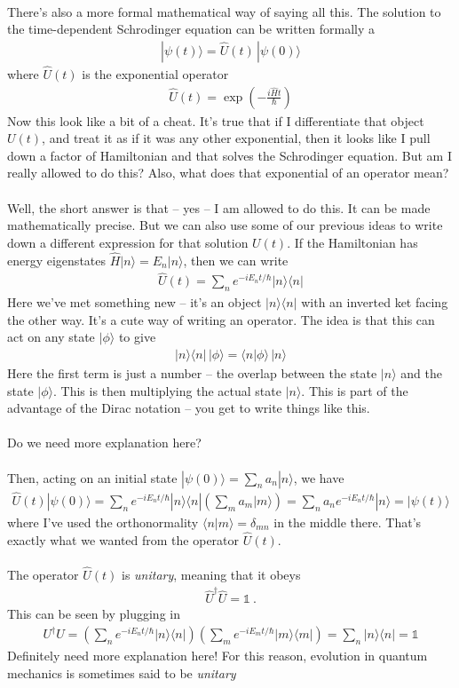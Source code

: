 \documentclass[12pt]{article}
\def\be{\begin{eqnarray}}
\def\ee{\end{eqnarray}}
\newcommand{\nn}{\nonumber}
\newcommand\para{\paragraph{}}
\newcommand{\ket}[1]{|#1\rangle}
\newcommand{\bra}[1]{\langle#1|}
\newcommand{\co}{\color{olive}}
\newcommand{\cblue}{\color{blue}}
\begin{document}
{\para
There's also a more formal mathematical way of saying all this. 
{\co The solution to the time-dependent Schrodinger equation can be written formally a 
%
\be \ket{\psi(t)} = \hat{U}(t)\, \ket{\psi(0)}\nn\ee
%
where $\hat{U}(t)$ is the exponential operator
%
\be \hat{U}(t) = \exp\left(-\frac{i\hat{H}t}{\hbar}
\right)\nn\ee
%
} Now this look like a bit of a cheat. It's true that if I differentiate that object $U(t)$, and treat it as if it was any other exponential, then it looks like I pull down a factor of Hamiltonian and that solves the Schrodinger equation. But am I really allowed to do this? Also, what does that exponential of an operator mean? 

\para
Well, the short answer is that -- yes -- I am allowed to do this. It can be made mathematically precise. But we can also use some of our previous ideas to write down a different expression for that solution $U(t)$. {\co  If the Hamiltonian has energy eigenstates $\hat{H}\ket{n} = E_n\ket{n}$, then we can write
%
\be \hat{U}(t) = \sum_n e^{-iE_nt/\hbar}\ket{n}\bra{n}\nn\ee
%
} Here we've met something new -- it's an object $\ket{n}\bra{n}$ with an inverted ket facing the other way. It's a cute way of writing an operator. {\co The idea is that this can act on any state $\ket{\phi}$ to give
%
\be \ket{n}\bra{n}\,\ket{\phi} = \bra{n}\phi\rangle\,\ket{n}\nn\ee
%
} Here the first term is just a number -- the overlap between the state $\ket{n}$ and the state $\ket{\phi}$. This is then multiplying the actual state $\ket{n}$. This is part of the advantage of the Dirac notation -- you get to write things like this.

\para
{\cblue Do we need more explanation here? }

\para
{\co Then, acting on an initial state $\ket{\psi(0)} = \sum_n a_n\ket{n}$, we have
%
\be \hat{U}(t) \ket{\psi(0)} = \sum_ne^{-iE_nt/\hbar} \ket{n}\bra{n}\left(\sum_m a_m \ket{m}\right) = \sum_n a_n e^{-iE_nt/\hbar}\ket{n} = \ket{\psi(t)}\nn\ee
%
} where I've used the orthonormality $\bra{n}m\rangle = \delta_{mn}$ in the middle there. {\co That's exactly what we wanted from the operator $\hat{U}(t)$.}

\para
{\co 
The operator $\hat{U}(t)$ is {\it unitary}, meaning that it obeys
%
\be \hat{U}^\dagger \hat{U}=\mathds{1}\ .\ee
%
This can be seen by plugging in 
%
\be  U^\dagger U = \left(\sum_ne^{-iE_nt/\hbar} \ket{n}\bra{n}\right) \left(\sum_me^{-iE_mt/\hbar} \ket{m}\bra{m}\right) =  \sum_n \ket{n}\bra{n} = \mathds{1}\nn\ee
%
}{\cblue Definitely need more explanation here!} {\co For this reason, evolution in quantum mechanics is sometimes said to be {\it unitary}}


}
\end{document}
